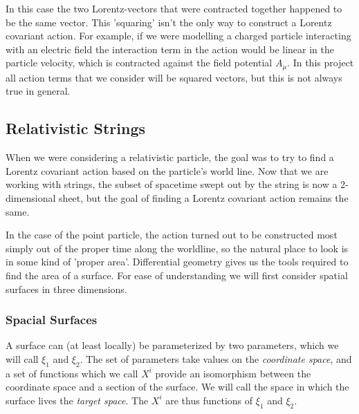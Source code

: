 \documentclass[a4paper,12pt]{article}
\numberwithin{equation}{section}
\begin{document}
In this case the two Lorentz-vectors that were contracted together happened to be the same vector. This 'squaring' isn't the only way to construct a Lorentz covariant action. For example, if we were modelling a charged particle interacting with an electric field the interaction term in the action would be linear in the particle velocity, which is contracted against the field potential $A_\mu$. In this project all action terms that we consider will be squared vectors, but this is not always true in general. 
\subsection{Relativistic Strings}\label{sectionstringaction}
When we were considering a relativistic particle, the goal was to try to find a Lorentz covariant action based on the particle's world line. Now that we are working with strings, the subset of spacetime swept out by the string is now a 2-dimensional sheet, but the goal of finding a Lorentz covariant action remains the same. 

In the case of the point particle, the action turned out to be constructed most simply out of the proper time along the worldline, so the natural place to look is in some kind of 'proper area'. Differential geometry gives us the tools required to find the area of a surface. For ease of understanding we will first consider spatial surfaces in three dimensions.
\subsubsection{Spacial Surfaces}
A surface can (at least locally) be parameterized by two parameters, which we will call $\xi_1$ and  $\xi_2$. The set of parameters take values on the \emph{coordinate space}, and a set of functions which we call $X^i$ provide an isomorphism between the coordinate space and a section of the surface. We will call the space in which the surface lives the \emph{target space}. The $X^i$ are thus functions of $\xi_1$ and $\xi_2$.
\end{document}

